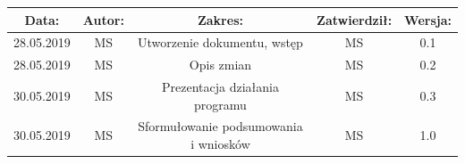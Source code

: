 \documentclass[a4paper,12pt]{article}
\begin{document}
\begin{center}
\begin{tabular}{ |c|c|c|c|c| } 
 \hline
 \textbf{Data:} & \textbf{Autor:} & \textbf{Zakres:} & \textbf{Zatwierdził:} & \textbf{Wersja:} \\ 
 \hline
 28.05.2019 & MS & Utworzenie dokumentu, wstęp & MS & 0.1 \\ 
 \hline
 28.05.2019 & MS & Opis zmian & MS & 0.2 \\ 
 \hline
 30.05.2019 & MS & Prezentacja działania programu & MS & 0.3 \\ 
 \hline
 30.05.2019 & MS & Sformułowanie podsumowania i wniosków & MS & 1.0 \\ 
 \hline
 \end{tabular}
\end{center}
\end{document}
